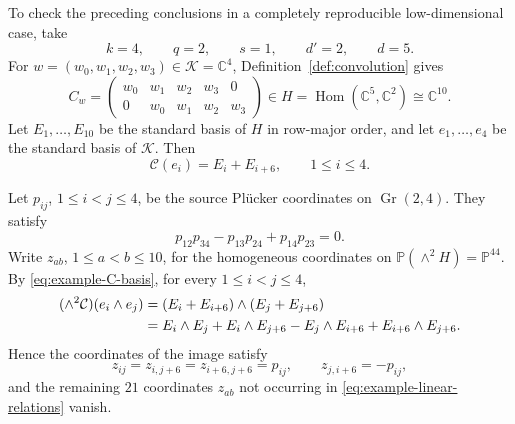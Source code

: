 \documentclass{siamonline250211}
\newcommand{\CC}{\mathbb C}
\newcommand{\PP}{\mathbb P}
\newcommand{\Gr}{\operatorname{Gr}}
\newcommand{\Hom}{\operatorname{Hom}}
\newcommand{\cK}{\mathcal K}
\newcommand{\cC}{\mathcal C}
\begin{document}
To check the preceding conclusions in a completely reproducible
low-dimensional case, take
\[
  k=4,\qquad q=2,\qquad s=1,\qquad d'=2,\qquad d=5.
\]
For $w=(w_0,w_1,w_2,w_3)\in\cK=\CC^4$,
Definition~\ref{def:convolution} gives
\begin{equation}\label{eq:example-convolution-matrix}
  C_w=
  \begin{pmatrix}
    w_0&w_1&w_2&w_3&0\\
    0&w_0&w_1&w_2&w_3
  \end{pmatrix}
  \in H=\Hom(\CC^5,\CC^2)\cong\CC^{10}.
\end{equation}
Let $E_1,\ldots,E_{10}$ be the standard basis of $H$ in row-major order,
and let $e_1,\ldots,e_4$ be the standard basis of $\cK$. Then
\begin{equation}\label{eq:example-C-basis}
  \cC(e_i)=E_i+E_{i+6},\qquad 1\leq i\leq4.
\end{equation}

Let $p_{ij}$, $1\leq i<j\leq4$, be the source Pl\"ucker coordinates on
$\Gr(2,4)$. They satisfy
\begin{equation}\label{eq:example-source-Plucker}
  p_{12}p_{34}-p_{13}p_{24}+p_{14}p_{23}=0.
\end{equation}
Write $z_{ab}$, $1\leq a<b\leq10$, for the homogeneous coordinates on
$\PP(\wedge^2H)=\PP^{44}$. By \eqref{eq:example-C-basis}, for every
$1\leq i<j\leq4$,
\begin{align}\label{eq:example-wedge-map}
  (\wedge^2\cC)(e_i\wedge e_j)
  &=(E_i+E_{i+6})\wedge(E_j+E_{j+6})\notag\\
  &=E_i\wedge E_j+E_i\wedge E_{j+6}
    -E_j\wedge E_{i+6}+E_{i+6}\wedge E_{j+6}.
\end{align}
Hence the coordinates of the image satisfy
\begin{equation}\label{eq:example-linear-relations}
  z_{ij}=z_{i,j+6}=z_{i+6,j+6}=p_{ij},
  \qquad z_{j,i+6}=-p_{ij},
\end{equation}
and the remaining $21$ coordinates $z_{ab}$ not occurring in
\eqref{eq:example-linear-relations} vanish.
\end{document}
